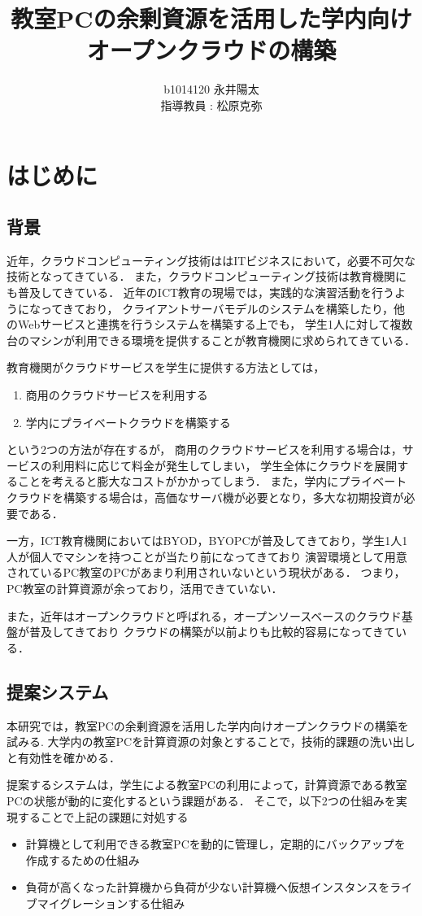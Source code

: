 \documentclass[11pt,a4paper]{jsarticle}
\author{%
b1014120 永井陽太\\指導教員 : 松原克弥
}
\title{教室PCの余剰資源を活用した学内向けオープンクラウドの構築}
\begin{document}
\maketitle

\section{はじめに}
\subsection{背景}
近年，クラウドコンピューティング技術ははITビジネスにおいて，必要不可欠な技術となってきている．
また，クラウドコンピューティング技術は教育機関にも普及してきている．
近年のICT教育の現場では，実践的な演習活動を行うようになってきており，
クライアントサーバモデルのシステムを構築したり，他のWebサービスと連携を行うシステムを構築する上でも，
学生1人に対して複数台のマシンが利用できる環境を提供することが教育機関に求められてきている．
\par 教育機関がクラウドサービスを学生に提供する方法としては，
\begin{enumerate}
	\item 商用のクラウドサービスを利用する
	\item 学内にプライベートクラウドを構築する
\end{enumerate}
という2つの方法が存在するが，
商用のクラウドサービスを利用する場合は，サービスの利用料に応じて料金が発生してしまい，
学生全体にクラウドを展開することを考えると膨大なコストがかかってしまう．
また，学内にプライベートクラウドを構築する場合は，高価なサーバ機が必要となり，多大な初期投資が必要である．
\par 一方，ICT教育機関においてはBYOD，BYOPCが普及してきており，学生1人1人が個人でマシンを持つことが当たり前になってきており
演習環境として用意されているPC教室のPCがあまり利用されいないという現状がある．
つまり，PC教室の計算資源が余っており，活用できていない．
\par また，近年はオープンクラウドと呼ばれる，オープンソースベースのクラウド基盤が普及してきており
クラウドの構築が以前よりも比較的容易になってきている．

\subsection{提案システム}
本研究では，教室PCの余剰資源を活用した学内向けオープンクラウドの構築を試みる.
大学内の教室PCを計算資源の対象とすることで，技術的課題の洗い出しと有効性を確かめる．
\par 提案するシステムは，学生による教室PCの利用によって，計算資源である教室PCの状態が動的に変化するという課題がある．
そこで，以下2つの仕組みを実現することで上記の課題に対処する
\begin{itemize}
	\item 計算機として利用できる教室PCを動的に管理し，定期的にバックアップを作成するための仕組み
	\item 負荷が高くなった計算機から負荷が少ない計算機へ仮想インスタンスをライブマイグレーションする仕組み
\end{itemize}
\end{document}

